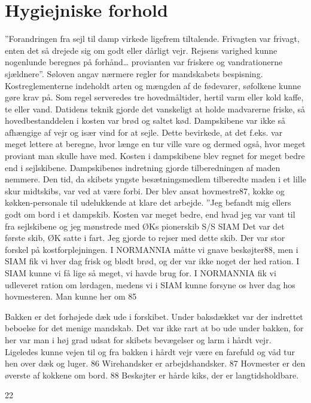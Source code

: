 \chapter{Hygiejniske forhold}\label{hygiejniske-forhold}

''Forandringen fra sejl til damp virkede ligefrem tiltalende. Frivagten
var frivagt, enten det så drejede sig om godt eller dårligt vejr.
Rejsens varighed kunne nogenlunde beregnes på forhånd\ldots{} provianten
var friskere og vandrationerne sjældnere''. Søloven angav nærmere regler
for mandskabets bespisning. Kostreglementerne indeholdt arten og mængden
af de fødevarer, søfolkene kunne gøre krav på. Som regel serveredes tre
hovedmåltider, hertil varm eller kold kaffe, te eller vand. Datidens
teknik gjorde det vanskeligt at holde madvarerne friske, så
hovedbestanddelen i kosten var brød og saltet kød. Dampskibene var ikke
så afhængige af vejr og især vind for at sejle. Dette bevirkede, at det
f.eks. var meget lettere at beregne, hvor længe en tur ville vare og
dermed også, hvor meget proviant man skulle have med. Kosten i
dampskibene blev regnet for meget bedre end i sejlskibene. Dampskibenes
indretning gjorde tilberedningen af maden nemmere. Den tid, da skibets
yngste besætningsmedlem tilberedte maden i et lille skur midtskibs, var
ved at være forbi. Der blev ansat hovmestre87, kokke og køkken-personale
til udelukkende at klare det arbejde. ''Jeg befandt mig ellers godt om
bord i et dampskib. Kosten var meget bedre, end hvad jeg var vant til
fra sejlskibene og jeg mønstrede med ØKs pionerskib S/S SIAM Det var det
første skib, ØK satte i fart. Jeg gjorde to rejser med dette skib. Der
var stor forskel på kostforplejningen. I NORMANNIA måtte vi gnave
beskøjter88, men i SIAM fik vi hver dag frisk og blødt brød, og der var
ikke noget der hed ration. I SIAM kunne vi få lige så meget, vi havde
brug for. I NORMANNIA fik vi udleveret ration om lørdagen, medens vi i
SIAM kunne forsyne os hver dag hos hovmesteren. Man kunne her om 85

Bakken er det forhøjede dæk ude i forskibet. Under baksdækket var der
indrettet beboelse for det menige mandskab. Det var ikke rart at bo ude
under bakken, for her var man i høj grad udsat for skibets bevægelser og
larm i hårdt vejr. Ligeledes kunne vejen til og fra bakken i hårdt vejr
være en farefuld og våd tur hen over dæk og luger. 86 Wirehandsker er
arbejdshandsker. 87 Hovmester er den øverste af kokkene om bord. 88
Beskøjter er hårde kiks, der er langtidsholdbare.

22

